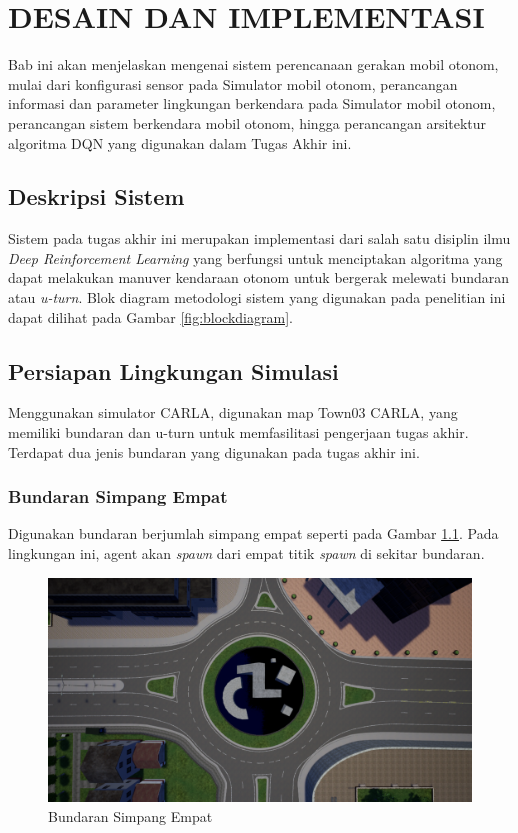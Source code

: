 \chapter{DESAIN DAN IMPLEMENTASI}
\label{chap:desainimplementasi}

Bab ini akan menjelaskan mengenai sistem perencanaan gerakan mobil otonom, mulai dari konfigurasi sensor pada Simulator mobil otonom, perancangan informasi dan parameter lingkungan berkendara pada Simulator mobil otonom, perancangan sistem berkendara mobil otonom, hingga perancangan arsitektur algoritma DQN yang digunakan dalam Tugas Akhir ini.


\section{Deskripsi Sistem}
\label{sec:deskripsisistem}

Sistem pada tugas akhir ini merupakan implementasi dari salah satu disiplin ilmu \textit{Deep Reinforcement Learning} yang berfungsi untuk menciptakan algoritma yang dapat melakukan manuver kendaraan otonom untuk bergerak melewati bundaran atau \textit{u-turn}. Blok diagram metodologi sistem yang digunakan pada penelitian ini dapat dilihat pada Gambar \ref{fig:blockdiagram}.

\section{Persiapan Lingkungan Simulasi}
\label{sec:simulasi}
Menggunakan simulator CARLA, digunakan map Town03 CARLA, yang memiliki bundaran dan u-turn untuk memfasilitasi pengerjaan tugas akhir. Terdapat dua jenis bundaran yang digunakan pada tugas akhir ini.

\subsection{Bundaran Simpang Empat}
Digunakan bundaran berjumlah simpang empat seperti pada Gambar  \ref{fig:bundaran_town03}. Pada lingkungan ini, agent akan \textit{spawn }dari empat titik \textit{spawn} di sekitar bundaran.
\begin{figure}[H] 
	\centering
	\includegraphics[width=.7\linewidth]{images/bundaran}
	\caption{Bundaran Simpang Empat}
	\label{fig:bundaran_town03}
\end{figure}

